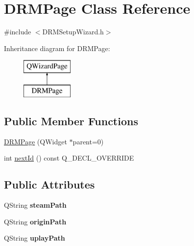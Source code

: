 \hypertarget{class_d_r_m_page}{}\section{D\+R\+M\+Page Class Reference}
\label{class_d_r_m_page}


{\ttfamily \#include $<$D\+R\+M\+Setup\+Wizard.\+h$>$}

Inheritance diagram for D\+R\+M\+Page\+:\begin{figure}[H]
\begin{center}
\leavevmode
\includegraphics[height=2.000000cm]{class_d_r_m_page}
\end{center}
\end{figure}
\subsection*{Public Member Functions}
\begin{DoxyCompactItemize}
\item 
\hyperlink{class_d_r_m_page_a86f6bcd03f8f8048e36b1b5b96000e2a}{D\+R\+M\+Page} (Q\+Widget $\ast$parent=0)
\item 
int \hyperlink{class_d_r_m_page_aeb08c4632433e1117268600b06d5a66e}{next\+Id} () const Q\+\_\+\+D\+E\+C\+L\+\_\+\+O\+V\+E\+R\+R\+I\+D\+E
\end{DoxyCompactItemize}
\subsection*{Public Attributes}
\begin{DoxyCompactItemize}
\item 
\hypertarget{class_d_r_m_page_a9f9e4dae1a8e76002633755bfa9fe010}{}Q\+String {\bfseries steam\+Path}\label{class_d_r_m_page_a9f9e4dae1a8e76002633755bfa9fe010}

\item 
\hypertarget{class_d_r_m_page_a55098eece425c26ac941cab8c6ce5ca2}{}Q\+String {\bfseries origin\+Path}\label{class_d_r_m_page_a55098eece425c26ac941cab8c6ce5ca2}

\item 
\hypertarget{class_d_r_m_page_a0474d31be476556b48d82dcb67bdfad3}{}Q\+String {\bfseries uplay\+Path}\label{class_d_r_m_page_a0474d31be476556b48d82dcb67bdfad3}

\end{DoxyCompactItemize}


